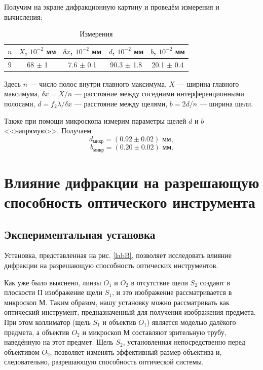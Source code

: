 \documentclass[a4paper,12pt]{article} %
\begin{document}
Получим на экране дифракционную картину и проведём измерения и вычисления:

\begin{table}[h!]
	\centering
	\caption{Измерения}
	\begin{tabular}{|c|c|c|c|c|} \hline
		$n$ &	$X$, $ 10^{-2} $ мм &	$\delta x$, $ 10^{-2} $ мм& $d$, $ 10^{-2} $ мм & $b$, $ 10^{-2} $ мм \\
		\hline
		9	&	68 $\pm$ 1  & 7.6 $\pm$ 0.1 &	90.3 $\pm$ 1.8 &	20.1 $\pm$ 0.4 \\ \hline
	\end{tabular}   
\end{table}

Здесь $n$ --- число полос внутри главного максимума, $X$ --- ширина главного максимума, $\delta x = X/n$ --- расстояние между соседними интерференционными полосами, $d = f_2 \lambda/\delta x$ --- расстояние между щелями, $b = 2d/n$ --- ширина щели.

Также при помощи микроскопа измерим параметры щелей $ d $ и $ b $ <<напрямую>>. Получаем
\[ \boxed{d_\text{микр} = (0.92 \pm 0.02) \text{ мм},} \]
\[ \boxed{b_\text{микр} = (0.20 \pm 0.02) \text{ мм}.} \]

\section{Влияние дифракции на разрешающую способность оптического инструмента}

\subsection{Экспериментальная установка}

Установка, представленная на рис. \ref{labB}, позволяет исследовать влияние дифракции на разрешающую способность оптических инструментов.

Как уже было выяснено, линзы $O_1$ и $ O_2$ в отсутствие щели $S_2$ создают в плоскости П изображение щели $S_1$, и это изображение рассматривается в микроскоп М. Таким образом, нашу установку можно рассматривать как оптический инструмент, предназначенный для получения изображения предмета. При этом коллиматор (щель $S_1$ и объектив $O_1$) является моделью далёкого предмета, а объектив $O_2$ и микроскоп М составляют зрительную трубу, наведённую на этот предмет.
Щель $S_2$, установленная непосредственно перед объективом $O_2$, позволяет изменять эффективный размер объектива и, следовательно, разрешающую способность оптической системы.
\end{document}
